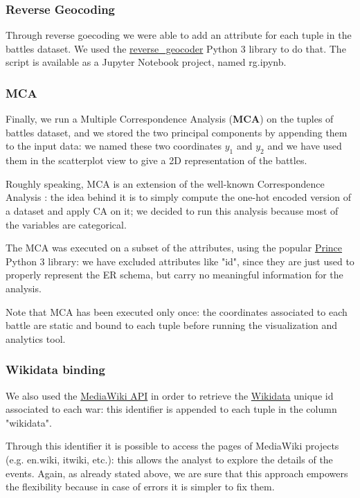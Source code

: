 \subsubsection{Reverse Geocoding}
Through reverse goecoding we were able to add an attribute for each tuple in the battles dataset. We used the \href{https://pypi.org/project/reverse_geocoder/}{reverse\_geocoder} Python 3 library to do that. The script is available as a Jupyter Notebook project, named rg.ipynb.

\subsubsection{MCA}
Finally, we run a Multiple Correspondence Analysis (\textbf{MCA}) \cite{HD07} on the tuples of battles dataset, and we stored the two principal components by appending them to the input data: we named these two coordinates $y_1$ and $y_2$ and we have used them in the scatterplot view to give a 2D representation of the battles.

Roughly speaking, MCA is an extension of the well-known Correspondence Analysis \cite{Hill74}: the idea behind it is to simply compute the one-hot encoded version of a dataset and apply CA on it; we decided to run this analysis because most of the variables are categorical.

The MCA was executed on a subset of the attributes, using the popular \href{https://pypi.org/project/prince}{Prince} Python 3 library: we have excluded attributes like "id", since they are just used to properly represent the ER schema, but carry no meaningful information for the analysis.

Note that MCA has been executed only once: the coordinates associated to each battle are static and bound to each tuple before running the visualization and analytics tool.

\subsubsection{Wikidata binding}
We also used the \href{https://www.mediawiki.org/wiki/API:Main_page}{MediaWiki API} in order to retrieve the \href{https://wikidata.org}{Wikidata} unique id associated to each war: this identifier is appended to each tuple in the column "wikidata".

Through this identifier it is possible to access the pages of MediaWiki projects (e.g. en.wiki, itwiki, etc.): this allows the analyst to explore the details of the events. Again, as already stated above, we are sure that this approach empowers the flexibility because in case of errors it is simpler to fix them.
